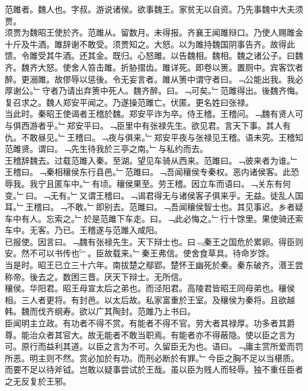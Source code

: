 \documentclass{zhvt-classic}
\begin{document}

\hspace*{2em}范雎者。魏人也。字叔。游说诸侯。欲事魏王。家贫无以自资。乃先事魏中大夫须贾。\\
\hspace*{2em}须贾为魏昭王使於齐。范雎从。留数月。未得报。齐襄王闻雎辩口。乃使人赐雎金十斤及牛酒。雎辞谢不敢受。须贾知之。大怒。以为雎持魏国阴事告齐。故得此馈。令雎受其牛酒。还其金。既归。心怒雎。以告魏相。魏相。魏之诸公子。曰魏齐。魏齐大怒。使舍人笞击雎。折胁摺齿。雎详死。即卷以箦。置厕中。宾客饮者醉。更溺雎。故僇辱以惩後。令无妄言者。雎从箦中谓守者曰。﹁公能出我。我必厚谢公。﹂守者乃请出弃箦中死人。魏齐醉。曰。﹁可矣。﹂范雎得出。後魏齐悔。复召求之。魏人郑安平闻之。乃遂操范雎亡。伏匿。更名姓曰张禄。\\
\hspace*{2em}当此时。秦昭王使谒者王稽於魏。郑安平诈为卒。侍王稽。王稽问。﹁魏有贤人可与俱西游者乎。﹂郑安平曰。﹁臣里中有张禄先生。欲见君。言天下事。其人有仇。不敢昼见。﹂王稽曰。﹁夜与俱来。﹂郑安平夜与张禄见王稽。语未究。王稽知范雎贤。谓曰。﹁先生待我於三亭之南。﹂与私约而去。\\
\hspace*{2em}王稽辞魏去。过载范雎入秦。至湖。望见车骑从西来。范雎曰。﹁彼来者为谁。﹂王稽曰。﹁秦相穰侯东行县邑。﹂范雎曰。﹁吾闻穰侯专秦权。恶内诸侯客。此恐辱我。我宁且匿车中。﹂有顷。穰侯果至。劳王稽。因立车而语曰。﹁关东有何变。﹂曰。﹁无有。﹂又谓王稽曰。﹁谒君得无与诸侯客子俱来乎。无益。徒乱人国耳。﹂王稽曰。﹁不敢。﹂即别去。范雎曰。﹁吾闻穰侯智士也。其见事迟。乡者疑车中有人。忘索之。﹂於是范雎下车走。曰。﹁此必悔之。﹂行十馀里。果使骑还索车中。无客。乃已。王稽遂与范雎入咸阳。\\
\hspace*{2em}已报使。因言曰。﹁魏有张禄先生。天下辩士也。曰﹃秦王之国危於累卵。得臣则安。然不可以书传也﹄。臣故载来。﹂秦王弗信。使舍食草具。待命岁馀。\\
\hspace*{2em}当是时。昭王已立三十六年。南拔楚之鄢郢。楚怀王幽死於秦。秦东破齐。湣王尝称帝。後去之。数困三晋。厌天下辩士。无所信。\\
\hspace*{2em}穰侯。华阳君。昭王母宣太后之弟也。而泾阳君。高陵君皆昭王同母弟也。穰侯相。三人者更将。有封邑。以太后故。私家富重於王室。及穰侯为秦将。且欲越韩。魏而伐齐纲寿。欲以广其陶封。范雎乃上书曰。\\
\hspace*{2em}臣闻明主立政。有功者不得不赏。有能者不得不官。劳大者其禄厚。功多者其爵尊。能治众者其官大。故无能者不敢当职焉。有能者亦不得蔽隐。使以臣之言为可。原行而益利其道。以臣之言为不可。久留臣无为也。语曰。﹁庸主赏所爱而罚所恶。明主则不然。赏必加於有功。而刑必断於有罪。﹂今臣之胸不足以当椹质。而要不足以待斧钺。岂敢以疑事尝试於王哉。虽以臣为贱人而轻辱。独不重任臣者之无反复於王邪。\\
\end{document}
